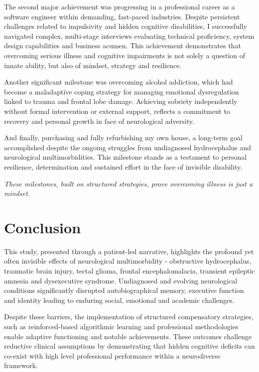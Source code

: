 \documentclass{article}
\begin{document}
The second major achievement was progressing in a professional career as a software engineer within demanding, fast-paced industries. Despite persistent challenges related to impulsivity and hidden cognitive disabilities, I successfully navigated complex, multi-stage interviews evaluating technical proficiency, system design capabilities and business acumen. This achievement demonstrates that overcoming serious illness and cognitive impairments is not solely a question of innate ability, but also of mindset, strategy and resilience.

Another significant milestone was overcoming alcohol addiction, which had become a maladaptive coping strategy for managing emotional dysregulation linked to trauma and frontal lobe damage. Achieving sobriety independently without formal intervention or external support, reflects a commitment to recovery and personal growth in face of neurological adversity.

And finally, purchasing and fully refurbishing my own house, a long-term goal accomplished despite the ongoing struggles from undiagnosed hydrocephalus and neurological multimorbidities. This milestone stands as a testament to personal resilience, determination and sustained effort in the face of invisible disability.
\\
\begin{center}
\textit{
These milestones, built on structured strategies, prove overcoming illness is just a mindset.}
\end{center}

\section*{Conclusion}
This study, presented through a patient-led narrative, highlights the profound yet often invisible effects of neurological multimorbidity - obstructive hydrocephalus, traumatic brain injury, tectal glioma, frontal encephalomalacia, transient epileptic amnesia and dysexecutive syndrome. Undiagnosed and evolving neurological conditions significantly disrupted autobiographical memory, executive function and identity leading to enduring social, emotional and academic challenges.

Despite these barriers, the implementation of structured compensatory strategies, such as reinforced-based algorithmic learning and professional methodologies enable adaptive functioning and notable achievements. These outcomes challenge reductive clinical assumptions by demonstrating that hidden cognitive deficits can co-exist with high level professional performance within a neurodiverse framework.
\end{document}
